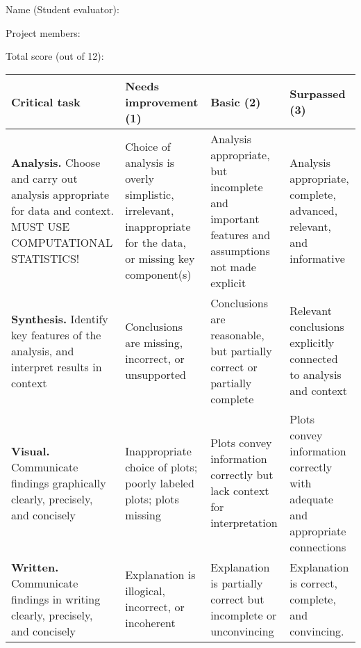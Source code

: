 \documentclass[11pt,onecolumn]{article}
\begin{document}
\vskip1in

Name (Student evaluator): 

Project members: 

Total score (out of 12): 

\begin{table}[htb]
  \centering
  \begin{tabular}{|p{4.5cm}|p{4.2cm}|p{3.75cm}|p{3.5cm}|}
    \hline
    \bf Critical task & \bf Needs improvement (1) & \bf Basic (2) & \bf Surpassed (3) \\
    \hline
    \hline
    \textbf{Analysis.} Choose and carry out analysis appropriate for data and context. MUST USE COMPUTATIONAL STATISTICS! & Choice of analysis is overly simplistic, irrelevant, inappropriate for the data, or missing key component(s)& Analysis appropriate, but incomplete and important features and assumptions not made explicit & Analysis appropriate, complete, advanced, relevant, and informative\\
    \hline
    \textbf{Synthesis.} Identify key features of the analysis, and interpret results in context & Conclusions are missing, incorrect, or unsupported & Conclusions are reasonable, but partially correct or partially complete & Relevant conclusions explicitly connected to analysis and context\\
    \hline
    \textbf{Visual.} Communicate findings graphically clearly, precisely, and concisely & Inappropriate choice of plots; poorly labeled plots; plots missing & Plots convey information correctly but lack context for interpretation & Plots convey information correctly with adequate and appropriate connections\\
    \hline
    \textbf{Written.} Communicate findings in writing clearly, precisely, and concisely & Explanation is illogical, incorrect, or incoherent & Explanation is partially correct but incomplete or unconvincing & Explanation is correct, complete, and convincing.\\
    \hline
  \end{tabular}
\end{table}
\end{document}
